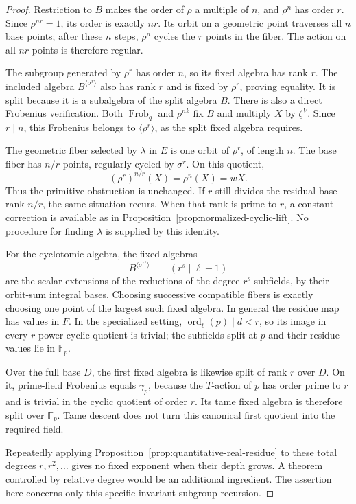 \documentclass[11pt]{article}
\theoremstyle{definition}
\theoremstyle{remark}
\begin{document}
\begin{proof}
Restriction to \(B\) makes the order of \(\rho\) a multiple of \(n\),
and \(\rho^n\) has order \(r\).
Since \(\rho^{nr}=1\), its order is exactly \(nr\).
Its orbit on a geometric point traverses all \(n\) base points;
after these \(n\) steps, \(\rho^n\) cycles the \(r\) points in
the fiber.  The action on all \(nr\) points is therefore regular.

The subgroup generated by \(\rho^r\) has order \(n\), so
its fixed algebra has rank \(r\).
The included algebra \(B^{\langle\sigma^r\rangle}\) also
has rank \(r\) and is fixed by \(\rho^r\), proving equality.
It is split because it is a subalgebra of the split algebra \(B\).
There is also a direct Frobenius verification.
Both \(\operatorname{Frob}_q\) and \(\rho^{nk}\) fix \(B\)
and multiply \(X\) by \(\zeta^V\).
Since \(r\mid n\), this Frobenius belongs to
\(\langle\rho^r\rangle\), as the split fixed algebra requires.

The geometric fiber selected by \(\lambda\) in \(E\) is
one orbit of \(\rho^r\), of length \(n\).
The base fiber has \(n/r\) points, regularly cycled by
\(\sigma^r\).  On this quotient,
\[
                       (\rho^r)^{n/r}(X)
                              =\rho^n(X)=wX.
\]
Thus the primitive obstruction is unchanged.
If \(r\) still divides the residual base rank \(n/r\),
the same situation recurs.  When that rank is prime to \(r\),
a constant correction is available as in
Proposition~\ref{prop:normalized-cyclic-lift}.
No procedure for finding \(\lambda\) is supplied by this identity.

For the cyclotomic algebra, the fixed algebras
\[
                     B^{\langle\sigma^{r^s}\rangle}
                  \qquad(r^s\mid\ell-1)
\]
are the scalar extensions of the reductions of the
degree-\(r^s\) subfields, by their orbit-sum integral bases.
Choosing successive compatible fibers is exactly choosing
one point of the largest such fixed algebra.
In general the residue map has values in \(F\).
In the specialized setting,
\(\operatorname{ord}_\ell(p)\mid d<r\), so its image in every
\(r\)-power cyclic quotient is trivial; the subfields split
at \(p\) and their residue values lie in \(\mathbb F_p\).

Over the full base \(D\), the first fixed algebra is likewise
split of rank \(r\) over \(D\).
On it, prime-field Frobenius equals \(\gamma_p\), because the
\(T\)-action of \(p\) has order prime to \(r\) and is trivial
in the cyclic quotient of order \(r\).
Its tame fixed algebra is therefore split over \(\mathbb F_p\).
Tame descent does not turn this canonical first quotient into
the required field.

Repeatedly applying
Proposition~\ref{prop:quantitative-real-residue} to these
total degrees \(r,r^2,\ldots\) gives no fixed exponent when
their depth grows.  A theorem controlled by relative degree
would be an additional ingredient.  The assertion here concerns
only this specific invariant-subgroup recursion.
\end{proof}
\end{document}

